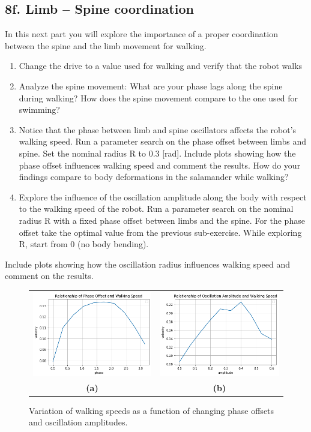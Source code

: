 \documentclass{cmc}
\begin{document}
\subsection*{8f. Limb – Spine coordination}
\label{sec:limb-spine-coordination}

In this next part you will explore the importance of a proper coordination
between the spine and the limb movement for walking.

\begin{enumerate}
\item Change the drive to a value used for walking and verify that the robot
  walks
\item Analyze the spine movement: What are your phase lags along the spine
  during walking? How does the spine movement compare to the one used for
  swimming?
\item Notice that the phase between limb and spine oscillators affects the
  robot’s walking speed. Run a parameter search on the phase offset between
  limbs and spine. Set the nominal radius R to 0.3 [rad]. Include plots showing
  how the phase offset influences walking speed and comment the results. How do
  your findings compare to body deformations in the salamander while walking?
\item Explore the influence of the oscillation amplitude along the body with
  respect to the walking speed of the robot. Run a parameter search on the
  nominal radius R with a fixed phase offset between limbs and the spine. For
  the phase offset take the optimal value from the previous sub-exercise. While
  exploring R, start from 0 (no body bending).
\end{enumerate}

Include plots showing how the oscillation radius influences walking speed and
comment on the results.

\begin{figure}[H]
\centering
\begin{tabular}{cc}
\includegraphics[height=0.3\columnwidth]{figures/8f_phase_3.png} &
\includegraphics[height=0.3\columnwidth]{figures/8f_amp.png}   \\
\textbf{(a)} & \textbf{(b)}
\end{tabular}
\caption{Variation of walking speeds as a function of changing phase offsets and oscillation amplitudes.}
\label{c}
\end{figure}
\end{document}
